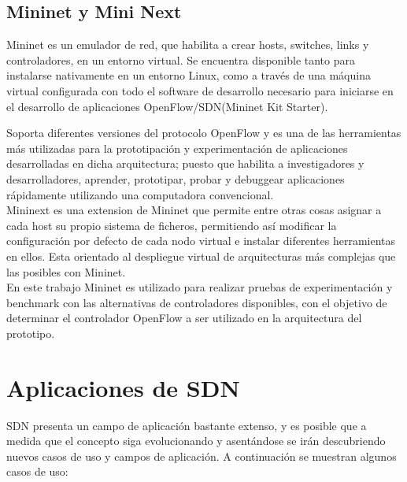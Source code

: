 \subsection{Mininet y Mini Next}
Mininet\cite{Mininet1} es un emulador de red, que habilita a crear hosts, switches, links y controladores, en un entorno virtual. Se encuentra disponible tanto para instalarse nativamente en un entorno Linux, como a través de una m\'aquina virtual configurada con todo el software de desarrollo necesario para iniciarse en el desarrollo de aplicaciones OpenFlow/SDN(Mininet Kit Starter). 

Soporta diferentes versiones del protocolo OpenFlow y es una de las herramientas m\'as utilizadas para la prototipaci\'on y experimentación de aplicaciones desarrolladas en dicha arquitectura; puesto que habilita a investigadores y desarrolladores, aprender, prototipar, probar y debuggear aplicaciones rápidamente utilizando una computadora convencional.\\

Mininext es una extension de Mininet que permite entre otras cosas asignar a cada host su propio sistema de ficheros, permitiendo as\'i modificar la configuraci\'on por defecto de cada nodo virtual e instalar diferentes herramientas en ellos. Esta orientado al despliegue virtual de arquitecturas m\'as complejas que las posibles con Mininet.\\   

En este trabajo Mininet es utilizado para realizar pruebas de experimentaci\'on y benchmark con las alternativas de controladores disponibles, con el objetivo de determinar el controlador OpenFlow a ser utilizado en la arquitectura del prototipo.\\

\section{Aplicaciones de SDN}
SDN presenta un campo de aplicación bastante extenso, y es posible que a medida que el concepto siga evolucionando y asentándose se irán descubriendo nuevos casos de uso y campos de aplicación. A continuación se muestran algunos casos de uso:

